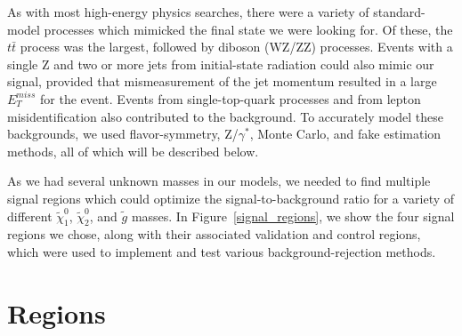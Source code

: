 As with most high-energy physics searches, there were a variety of standard-model processes which mimicked the final state we were looking for. Of these, the $t\bar{t}$ process was the largest, followed by diboson (WZ/ZZ) processes. Events with a single Z and two or more jets from initial-state radiation could also mimic our signal, provided that mismeasurement of the jet momentum resulted in a large $E_T^{miss}$ for the event. Events from single-top-quark processes and from lepton misidentification also contributed to the background. To accurately model these backgrounds, we used flavor-symmetry, Z/$\gamma^*$, Monte Carlo, and fake estimation methods, all of which will be described below.

As we had several unknown masses in our models, we needed to find multiple signal regions which could optimize the signal-to-background ratio for a variety of different $\tilde{\chi}^0_1$, $\tilde{\chi}^0_2$, and $\tilde{g}$ masses. In Figure~\ref{signal_regions}, we show the four signal regions we chose, along with their associated validation and control regions, which were used to implement and test various background-rejection methods.

\section{Regions}